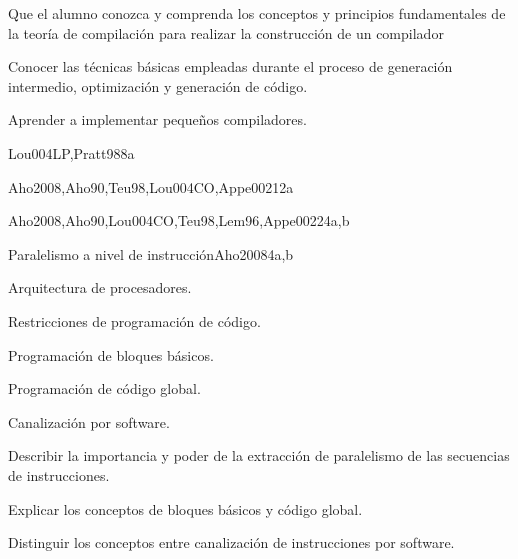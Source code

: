 \begin{syllabus}


\begin{justification}
Que el alumno conozca y comprenda los conceptos y principios
fundamentales de la teoría de compilación para realizar la
construcción de un compilador
\end{justification}

\begin{goals}
\item Conocer las técnicas básicas empleadas durante el proceso de generación intermedio, optimización y generación de código.
\item Aprender a implementar pequeños compiladores.
\end{goals}



\begin{unit}{\PLOverviewDef}{}{Lou004LP,Pratt98}{8}{a}
   \PLOverviewAllTopics
   \PLOverviewAllObjectives
\end{unit}

\begin{unit}{\PLBasicLanguageTranslationDef}{}{Aho2008,Aho90,Teu98,Lou004CO,Appe002}{12}{a}
   \PLBasicLanguageTranslationAllTopics
   \PLBasicLanguageTranslationAllObjectives
\end{unit}

\begin{unit}{\PLLanguageTranslatioSystemsDef}{}{Aho2008,Aho90,Lou004CO,Teu98,Lem96,Appe002}{24}{a,b}
   \PLLanguageTranslatioSystemsAllTopics
   \PLLanguageTranslatioSystemsAllObjectives
\end{unit}

\begin{unit}{Paralelismo a nivel de instrucción}{}{Aho2008}{4}{a,b}
  \begin{topics}
     \item Arquitectura de procesadores.
     \item Restricciones de programación de código.
     \item Programación de bloques básicos.
     \item Programación de código global.
     \item Canalización por software.
  \end{topics}

  \begin{learningoutcomes}
     \item Describir la importancia y poder de la extracción de paralelismo de las secuencias de instrucciones.
     \item Explicar los conceptos de bloques básicos y código global.
     \item Distinguir los conceptos entre canalización de instrucciones por software.
  \end{learningoutcomes}
\end{unit}


\end{syllabus}
